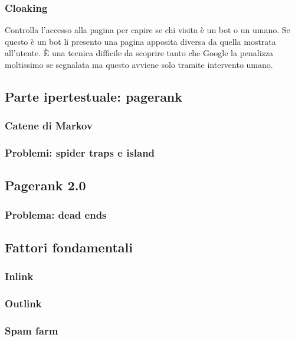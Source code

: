 			\subsubsection{Cloaking}
				Controlla l'accesso alla pagina per capire se chi visita è un bot o un umano. Se questo è un bot li presento una pagina apposita diversa da quella mostrata all'utente. È una tecnica difficile da scoprire tanto che Google la penalizza moltissimo se segnalata ma questo avviene solo tramite intervento umano.
			
	
		\subsection{Parte ipertestuale: pagerank}
		
			\subsubsection{Catene di Markov}
			
			\subsubsection{Problemi: spider traps e island}
				
		\subsection{Pagerank 2.0}
		
			\subsubsection{Problema: dead ends}
		
		\subsection{Fattori fondamentali}
		
			\subsubsection{Inlink}
			
			\subsubsection{Outlink}
			
			\subsubsection{Spam farm}
				
